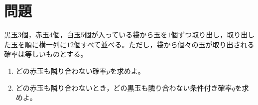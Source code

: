\documentclass[../../../doc/main]{subfiles}
\begin{document}
    \setcounter{chapter}{2}
    \setcounter{section}{1}
    \section{問題}\label{問題2}
        \begin{tcolorbox}
            黒玉$3$個，赤玉$4$個，白玉$5$個が入っている袋から玉を$1$個ずつ取り出し，取り出した玉を順に横一列に$12$個すべて並べる。ただし，袋から個々の玉が取り出される確率は等しいものとする。
            \begin{enumerate}
                \item [\kakkoichi] どの赤玉も隣り合わない確率$p$を求めよ。
                \item [\kakkoni] どの赤玉も隣り合わないとき，どの黒玉も隣り合わない条件付き確率$q$を求めよ。
            \end{enumerate}
        \end{tcolorbox}
\end{document}
